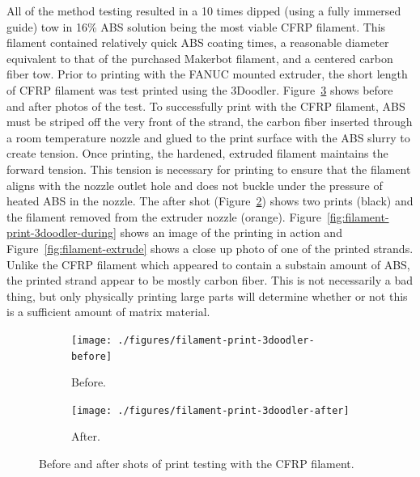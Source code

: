 All of the method testing resulted in a 10 times dipped (using a fully immersed guide) tow in 16\% ABS solution being the most viable CFRP filament. This filament contained relatively quick ABS coating times, a reasonable diameter equivalent to that of the purchased Makerbot filament, and a centered carbon fiber tow. Prior to printing with the FANUC mounted extruder, the short length of CFRP filament was test printed using the 3Doodler. Figure~\ref{fig:filament-print-test} shows before and after photos of the test. To successfully print with the CFRP filament, ABS must be striped off the very front of the strand, the carbon fiber inserted through a room temperature nozzle and glued to the print surface with the ABS slurry to create tension. Once printing, the hardened, extruded filament maintains the forward tension. This tension is necessary for printing to ensure that the filament aligns with the nozzle outlet hole and does not buckle under the pressure of heated ABS in the nozzle. The after shot (Figure~\ref{fig:filament-print-3doodler-after}) shows two prints (black) and the filament removed from the extruder nozzle (orange). Figure~\ref{fig:filament-print-3doodler-during} shows an image of the printing in action and Figure~\ref{fig:filament-extrude} shows a close up photo of one of the printed strands. Unlike the CFRP filament which appeared to contain a substain amount of ABS, the printed strand appear to be mostly carbon fiber. This is not necessarily a bad thing, but only physically printing large parts will determine whether or not this is a sufficient amount of matrix material. \\

\indent

\begin{figure}[h!]
        \centering
        \begin{subfigure}[b]{0.3\textwidth}
                \texttt{[image: ./figures/filament-print-3doodler-before]}
                \caption{Before.}
                \label{fig:filament-print-3doodler-before}
        \end{subfigure}
        \begin{subfigure}[b]{0.3\textwidth}
                \texttt{[image: ./figures/filament-print-3doodler-after]}
                \caption{After.}
                \label{fig:filament-print-3doodler-after}
        \end{subfigure}
        \caption{Before and after shots of print testing with the CFRP filament.}\label{fig:filament-print-test}
\end{figure}

